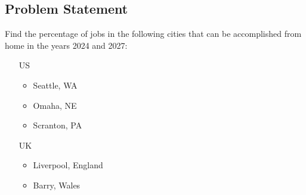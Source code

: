     
        \subsection{Problem Statement}
            Find the percentage of jobs in the following cities that can be accomplished from home in the years 2024 and 2027:
            \begin{itemize}
                \item[US]
                \begin{itemize}
                    \item Seattle, WA
                    \item Omaha, NE
                    \item Scranton, PA
                \end{itemize}
                \item[UK]
                \begin{itemize}
                    \item Liverpool, England
                    \item Barry, Wales
                \end{itemize}
            \end{itemize}
            
            

